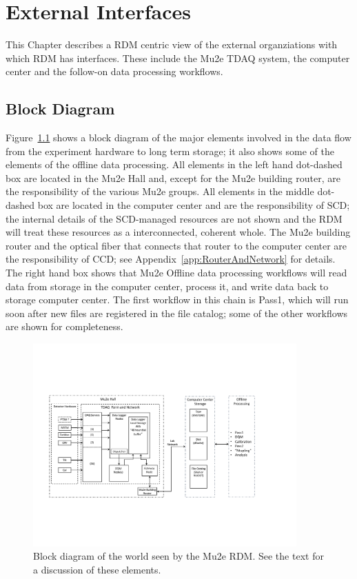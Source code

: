 \chapter{External Interfaces}
\label{ch:SelectedDetails}
This Chapter describes a RDM centric view of the external organziations
with which RDM has interfaces.  These include the Mu2e TDAQ system,
the computer center and the follow-on data processing workflows.

\section{Block Diagram}
\label{sec:BlockDiagram}

Figure~\ref{fig:blockdiagram} shows a block diagram of the major elements involved
in the data flow from the experiment hardware to long term storage; it also shows
some of the elements of the offline data processing.
All elements in the left hand dot-dashed box are located in the Mu2e Hall
and, except for the Mu2e building router, are the responsibility of the various Mu2e groups.
All elements in the middle dot-dashed box are located in the computer center
and are the responsibility of SCD; the internal details of the SCD-managed resources
are not shown and the RDM will treat these resources as a interconnected, coherent whole.
The Mu2e building router and the optical fiber that connects that router
to the computer center are the responsibility of CCD;
see Appendix~\ref{app:RouterAndNetwork} for details.
The right hand box shows that Mu2e Offline data processing workflows
will read data from storage in the computer center,
process it,
and write data back to storage computer center.
The first workflow in this chain is Pass1, which will run soon after new files
are registered in the file catalog;
some of the other workflows are shown for completeness.

\begin{figure}[tbp]
\centering
\includegraphics[width=0.9\textwidth]{figures/interface_with_TDAQ.pdf}
\caption[Block diagram of interfaces seen by the Mu2e RDM]{
  Block diagram of the world seen by the Mu2e RDM.
  See the text for a discussion of these elements.}
\label{fig:blockdiagram}
\end{figure}

